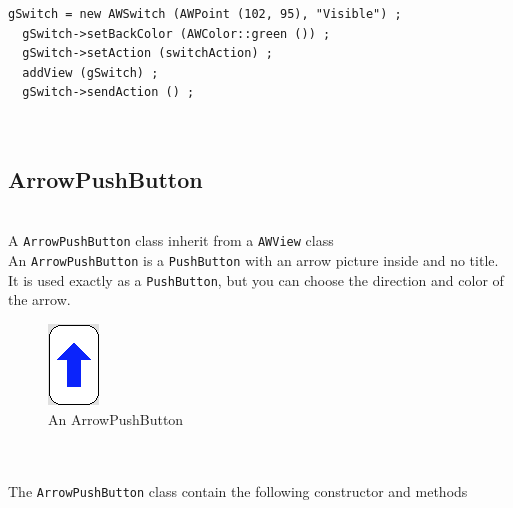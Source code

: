 \documentclass[a4paper,11pt]{extarticle}
\begin{document}
\begin{lstlisting}[language=Arduinonl]
  gSwitch = new AWSwitch (AWPoint (102, 95), "Visible") ;
  gSwitch->setBackColor (AWColor::green ()) ;
  gSwitch->setAction (switchAction) ;
  addView (gSwitch) ;
  gSwitch->sendAction () ;
\end{lstlisting}
  
~\\

\newpage
\subsection{ArrowPushButton}

~\\ A \texttt{ArrowPushButton} class inherit from a \texttt{AWView} class
~\\ An \texttt{ArrowPushButton} is a \texttt{PushButton} with an arrow picture inside and no title.
~\\ It is used exactly as a \texttt{PushButton}, but you can choose the direction and color of the arrow.
~\\

\begin{figure}[htbp]
   \centering
   \includegraphics[scale=0.55]{AWFig16.png} 
   \caption{An ArrowPushButton}
   \label{fig:16 }
\end{figure}

~\\

~\\ The \texttt{ArrowPushButton} class contain the following constructor and methods
\end{document}
